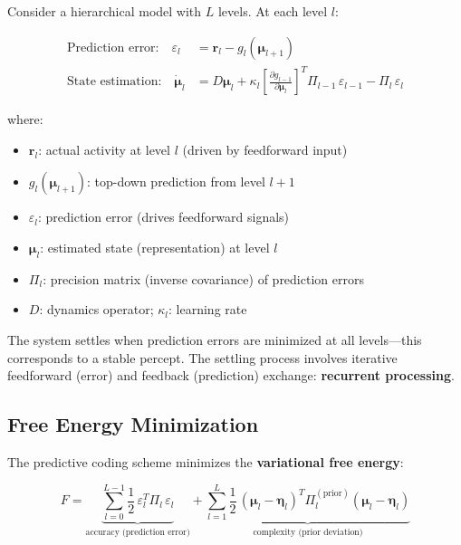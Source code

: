 \documentclass[11pt,a4paper]{report}
\begin{document}
Consider a hierarchical model with $L$ levels. At each level $l$:

\begin{mathbox}
\vspace{-6pt}
\begin{align}
  \text{Prediction error:}\quad \varepsilon_l &= \mathbf{r}_l - g_l(\boldsymbol{\mu}_{l+1}) \label{eq:pe2}\\[6pt]
  \text{State estimation:}\quad \dot{\boldsymbol{\mu}}_{l} &= D\boldsymbol{\mu}_l + \kappa_l \left[\frac{\partial g_{l-1}}{\partial \boldsymbol{\mu}_l}\right]^T \Pi_{l-1}\, \varepsilon_{l-1} - \Pi_l\, \varepsilon_l \label{eq:mu_update}
\end{align}
\vspace{-8pt}
\end{mathbox}

where:
\begin{itemize}[leftmargin=1.5em]
  \item $\mathbf{r}_l$: actual activity at level $l$ (driven by feedforward input)
  \item $g_l(\boldsymbol{\mu}_{l+1})$: top-down prediction from level $l{+}1$
  \item $\varepsilon_l$: prediction error (drives feedforward signals)
  \item $\boldsymbol{\mu}_l$: estimated state (representation) at level $l$
  \item $\Pi_l$: precision matrix (inverse covariance) of prediction errors
  \item $D$: dynamics operator; $\kappa_l$: learning rate
\end{itemize}

The system settles when prediction errors are minimized at all levels---this corresponds to a stable percept. The settling process involves iterative feedforward (error) and feedback (prediction) exchange: \textbf{recurrent processing}.

\subsection{Free Energy Minimization}

The predictive coding scheme minimizes the \textbf{variational free energy}:

\begin{mathbox}
\vspace{-8pt}
\[
  F = \underbrace{\sum_{l=0}^{L-1} \frac{1}{2}\, \varepsilon_l^T \Pi_l\, \varepsilon_l}_{\text{accuracy (prediction error)}} + \underbrace{\sum_{l=1}^{L} \frac{1}{2}\, \left(\boldsymbol{\mu}_l - \boldsymbol{\eta}_l\right)^T \Pi_l^{(\text{prior})} \left(\boldsymbol{\mu}_l - \boldsymbol{\eta}_l\right)}_{\text{complexity (prior deviation)}}
\]
\vspace{-10pt}
\end{mathbox}
\end{document}
